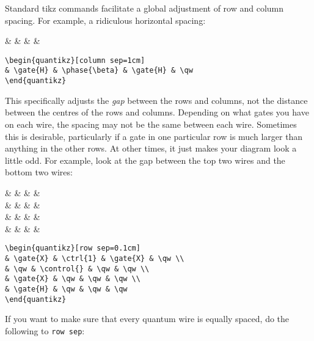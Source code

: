\documentclass[aps,pra,10pt,nofootinbib]{revtex4}
\begin{document}
Standard tikz commands facilitate a global adjustment of row and column spacing. For example, a ridiculous horizontal spacing:
\begin{Code}
\begin{center}
\begin{quantikz}[column sep=1cm]
&  & \phase{\beta} &  & \qw
\end{quantikz}
\end{center}
\tcblower
\begin{lstlisting}
\begin{quantikz}[column sep=1cm]
& \gate{H} & \phase{\beta} & \gate{H} & \qw
\end{quantikz}
\end{lstlisting}
\end{Code}
This specifically adjusts the \emph{gap} between the rows and columns, not the distance between the centres of the rows and columns. Depending on what gates you have on each wire, the spacing may not be the same between each wire. Sometimes this is desirable, particularly if a gate in one particular row is much larger than anything in the other rows. At other times, it just makes your diagram look a little odd. For example, look at the gap between the top two wires and the bottom two wires:
\begin{Code}
\begin{center}
\begin{quantikz}[row sep=0.1cm]
&  &  &  & \qw \\
& \qw & \control{} & \qw & \qw \\
&  & \qw & \qw & \qw \\
&  & \qw & \qw & \qw 

\end{quantikz}
\end{center}
\tcblower
\begin{lstlisting}
\begin{quantikz}[row sep=0.1cm]
& \gate{X} & \ctrl{1} & \gate{X} & \qw \\
& \qw & \control{} & \qw & \qw \\
& \gate{X} & \qw & \qw & \qw \\
& \gate{H} & \qw & \qw & \qw 
\end{quantikz}
\end{lstlisting}
\end{Code}
If you want to make sure that every quantum wire is equally spaced, do the following to \verb!row sep!:
\end{document}
